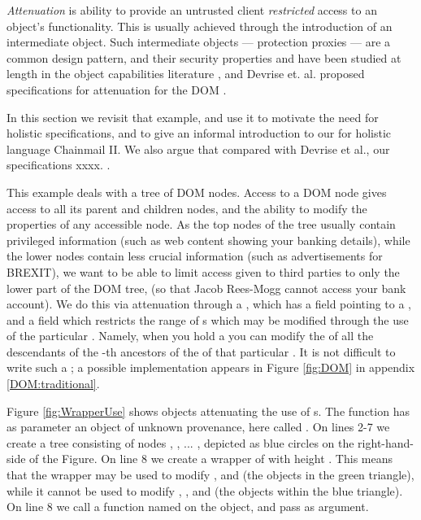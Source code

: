\emph{Attenuation} is ability to provide an untrusted client \emph{restricted}  access to an object's functionality. This is usually achieved through the introduction of an intermediate object. Such intermediate objects --- protection proxies \cite{gof} --- are a common design pattern, and their security properties and have been studied at length in the object capabilities literature \cite{MillerPhD,murray10-infoflow}, and 
Devrise et. al. proposed specifications for attenuation for the DOM \cite{dd}.

In this section we revisit that example, and use it to motivate the
need for holistic specifications, and to give an informal introduction
to our for holistic  language Chainmail II. We also argue that
compared with Devrise et al., our specifications xxxx.
{}.

This example deals with a tree of DOM nodes. Access to a DOM node
gives access to all its parent and children nodes, and the ability to
modify the properties of any accessible node. As the top nodes of the
tree usually contain privileged information (such as web content
showing your banking details), while the lower nodes contain less
crucial information (such as advertisements for BREXIT), we want to be
able to limit access given to third parties to only the lower part of
the DOM tree, (so that Jacob Rees-Mogg cannot access your bank
account). We do this via attenuation through a , which has
a field  pointing to a , and a field 
which restricts the range of s which may be modified through
the use of the particular . Namely, when you hold
a  you can modify the  of all the
descendants of the -th ancestors of the  of that
particular .  It is not difficult to write such
a ; a possible implementation appears in
Figure \ref{fig:DOM} in appendix \ref{DOM:traditional}.


Figure \ref{fig:WrapperUse} shows  
 objects    attenuating the use of 
s.
The
function  has as parameter an object of unknown
provenance, here called . On lines 2-7 we create a tree
consisting of nodes , , ... , depicted as blue
circles on the right-hand-side of the Figure. On line 8 we create a
wrapper of  with height . This means that the
wrapper  may be used to modify ,  and 
(\ie the objects in the green triangle), while it cannot be used to
modify , , and  (\ie the objects within the
blue triangle).  On line 8 we call a function named  on
the  object, and pass  as argument.

